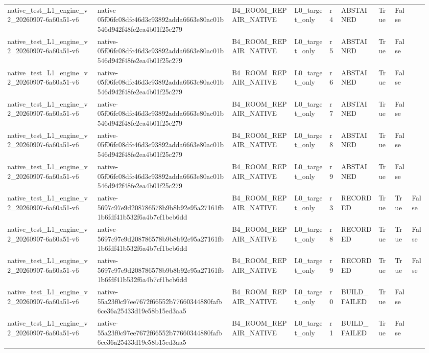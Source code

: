 \begin{tabular}{lllllllll}
native\_test\_L1\_engine\_v2\_20260907-6a60a51-v6 & native-05f06fc08dfc46d3c93892adda6663e80ac01b546d942f48fe2ea4b01f25c279 & B4\_ROOM\_REPAIR\_NATIVE & L0\_target\_only & r4 & ABSTAINED & True & False &  \\
native\_test\_L1\_engine\_v2\_20260907-6a60a51-v6 & native-05f06fc08dfc46d3c93892adda6663e80ac01b546d942f48fe2ea4b01f25c279 & B4\_ROOM\_REPAIR\_NATIVE & L0\_target\_only & r5 & ABSTAINED & True & False &  \\
native\_test\_L1\_engine\_v2\_20260907-6a60a51-v6 & native-05f06fc08dfc46d3c93892adda6663e80ac01b546d942f48fe2ea4b01f25c279 & B4\_ROOM\_REPAIR\_NATIVE & L0\_target\_only & r6 & ABSTAINED & True & False &  \\
native\_test\_L1\_engine\_v2\_20260907-6a60a51-v6 & native-05f06fc08dfc46d3c93892adda6663e80ac01b546d942f48fe2ea4b01f25c279 & B4\_ROOM\_REPAIR\_NATIVE & L0\_target\_only & r7 & ABSTAINED & True & False &  \\
native\_test\_L1\_engine\_v2\_20260907-6a60a51-v6 & native-05f06fc08dfc46d3c93892adda6663e80ac01b546d942f48fe2ea4b01f25c279 & B4\_ROOM\_REPAIR\_NATIVE & L0\_target\_only & r8 & ABSTAINED & True & False &  \\
native\_test\_L1\_engine\_v2\_20260907-6a60a51-v6 & native-05f06fc08dfc46d3c93892adda6663e80ac01b546d942f48fe2ea4b01f25c279 & B4\_ROOM\_REPAIR\_NATIVE & L0\_target\_only & r9 & ABSTAINED & True & False &  \\
native\_test\_L1\_engine\_v2\_20260907-6a60a51-v6 & native-5697c97e9d208786578b9b8b92e95a27161fb1b6fdf41b532f6a4b7cf1bcb6dd & B4\_ROOM\_REPAIR\_NATIVE & L0\_target\_only & r3 & RECORDED & True & True & False \\
native\_test\_L1\_engine\_v2\_20260907-6a60a51-v6 & native-5697c97e9d208786578b9b8b92e95a27161fb1b6fdf41b532f6a4b7cf1bcb6dd & B4\_ROOM\_REPAIR\_NATIVE & L0\_target\_only & r8 & RECORDED & True & True & False \\
native\_test\_L1\_engine\_v2\_20260907-6a60a51-v6 & native-5697c97e9d208786578b9b8b92e95a27161fb1b6fdf41b532f6a4b7cf1bcb6dd & B4\_ROOM\_REPAIR\_NATIVE & L0\_target\_only & r9 & RECORDED & True & True & False \\
native\_test\_L1\_engine\_v2\_20260907-6a60a51-v6 & native-55a23f0c97ee7672f66552b77660344880fafb6ce36a25433d19e58b15ed3aa5 & B4\_ROOM\_REPAIR\_NATIVE & L0\_target\_only & r0 & BUILD\_FAILED & True & False &  \\
native\_test\_L1\_engine\_v2\_20260907-6a60a51-v6 & native-55a23f0c97ee7672f66552b77660344880fafb6ce36a25433d19e58b15ed3aa5 & B4\_ROOM\_REPAIR\_NATIVE & L0\_target\_only & r1 & BUILD\_FAILED & True & False &  \\

\end{tabular}

